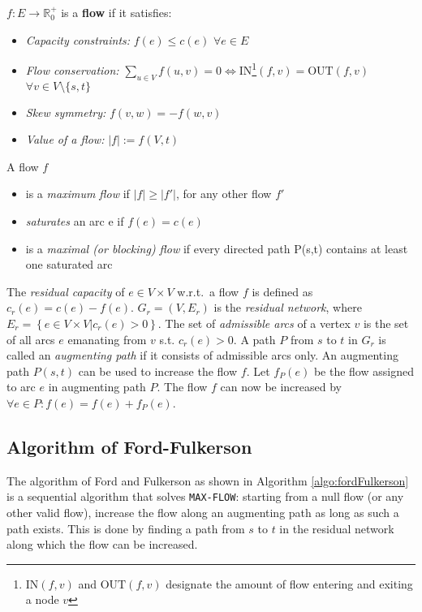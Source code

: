 \documentclass[a4paper,10pt, twocolumn]{article}
\begin{document}
\medskip
$f:E \rightarrow \mathbb{R}_0^{+}$ is a \textbf{flow} if it satisfies:
\begin{itemize}
	\item \emph{Capacity constraints:} $f(e) \leq c(e)$ $\forall e \in E$
	\item \emph{Flow conservation:} 
	$ \sum\limits_{u \in V} f(u,v) =  0 \Leftrightarrow \mathrm{IN}$\footnote{$\mathrm{IN}(f,v)$ and $\mathrm{OUT}(f,v)$ designate the amount of flow entering and exiting a node $v$}$(f,v) = \mathrm{OUT}(f,v)$ $\forall v \in V \setminus \{s,t\}$
	\item \emph{Skew symmetry:} $f(v,w) = -f(w,v)$
	\item \emph{Value of a flow:} $\lvert f\rvert := f(V,t)$ 
\end{itemize}

A flow $f$
\begin{itemize}
	\item is a \emph{maximum flow} if $\lvert f\rvert \geq \lvert f'\rvert$, for any other flow $f'$
	\item \emph{saturates} an arc e if $f(e) = c(e)$
	\item is a \emph{maximal (or blocking) flow} if every directed path P(s,t) contains at least one saturated arc
\end{itemize}
\medskip
The \emph{residual capacity} of $e \in V \times V$ w.r.t.\ a flow $f$ is defined as $c_r(e) = c(e) - f(e)$. $G_r = (V, E_r)$ is the \emph{residual network}, where $E_r = \left\{e \in V \times V \lvert c_r(e) > 0\right\}$. The set of \emph{admissible arcs} of a vertex $v$ is the set of all arcs $e$ emanating from $v$ s.t. $c_r(e) > 0$.  A path $P$ from $s$ to $t$ in $G_r$ is called an \emph{augmenting path} if it consists of admissible arcs only. An augmenting path $P(s,t)$ can be used to increase the flow $f$. Let $f_P(e)$ be the flow assigned to arc $e$ in augmenting path $P$. The flow $f$ can now be increased by $\forall e \in P: f(e) = f(e) + f_P(e)$.

\subsection{Algorithm of Ford-Fulkerson}
\label{sec:fordfulkerson}
The algorithm of Ford and Fulkerson as shown in Algorithm \ref{algo:fordFulkerson} is a sequential algorithm that solves \lstinline|MAX-FLOW|: starting from a null flow (or any other valid flow), increase the flow along an augmenting path as long as such a path exists. This is done by finding a path from $s$ to $t$ in the residual network along which the flow can be increased. 
\end{document}
